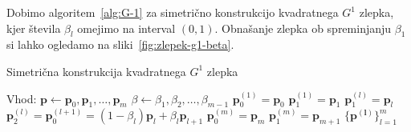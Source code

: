 \documentclass[isrm2, tisk]{fmfdelo}
\newcommand{\p}{\mathbf{p}}
\begin{document}
    Dobimo algoritem~\ref{alg:G-1} za simetrično konstrukcijo kvadratnega $G^1$ zlepka, kjer števila $\beta_l$ omejimo na interval $(0,1)$.
    Obnašanje zlepka ob spreminjanju $\beta_1$ si lahko ogledamo na sliki~\ref{fig:zlepek-g1-beta}.
    \begin{algorithm}[H]
        \caption{Simetrična konstrukcija kvadratnega $G^1$ zlepka}
        \label{alg:G-1}
        \begin{algorithmic}
            \State Vhod:
            \State $\p \gets \p_0,\p_1,\dots,\p_{m}$
            \State $\beta \gets \beta_1,\beta_2,\dots,\beta_{m-1}$
            \State
            \State $\p_0^{(1)} = \p_0$
            \State $\p_1^{(1)} = \p_1$
                \State $\p_1^{(l)}=\p_{l}$
                \State $\p_2^{(l)} = \p_0^{(l+1)} = (1-\beta_l)\p_l+\beta_l\p_{l+1}$
            \EndFor
            \State $\p_0^{(m)} = \p_m$
            \State $\p_1^{(m)} = \p_{m+1}$
            \State
            \State \Return $\{\mathbf{p^{(l)}}\}^{m}_{l=1}$
        \end{algorithmic}
    \end{algorithm}
\end{document}
